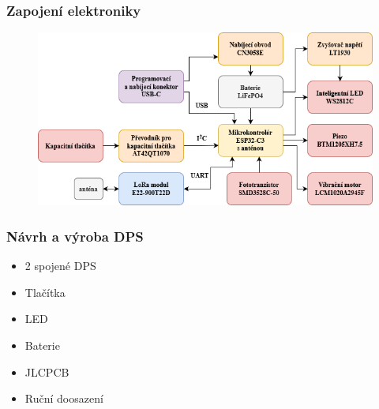 \documentclass[%
  12pt,       				%
	t,                  %
	aspectratio=1610,   %
	unicode,						%
]{beamer}				    	%
\begin{document}
\begin{frame} 
	\frametitle{Zapojení elektroniky}
	\begin{figure}%
		\centering	          
		\includegraphics[width=1\columnwidth]{obrazky/blokove_schema_finalni_verze.png}
	\end{figure}
\end{frame}

\begin{frame}
	\frametitle{Návrh a výroba DPS}
	\begin{itemize}
		\item 2 spojené DPS
		\item Tlačítka 
		\item LED
		\item Baterie
		\item JLCPCB
		\item Ruční doosazení 
	\end{itemize}
\end{frame}
\end{document}

